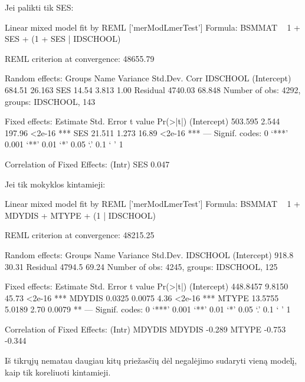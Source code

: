 \documentclass[a4paper]{article}
\begin{document}
Jei palikti tik SES:
\begin{Schunk}
\begin{Soutput}
Linear mixed model fit by REML ['merModLmerTest']
Formula: BSMMAT ~ 1 + SES + (1 + SES | IDSCHOOL) 

REML criterion at convergence: 48655.79 

Random effects:
 Groups   Name        Variance Std.Dev. Corr
 IDSCHOOL (Intercept)  684.51  26.163       
          SES           14.54   3.813   1.00
 Residual             4740.03  68.848       
Number of obs: 4292, groups: IDSCHOOL, 143

Fixed effects:
            Estimate Std. Error t value Pr(>|t|)    
(Intercept)  503.595      2.544  197.96   <2e-16 ***
SES           21.511      1.273   16.89   <2e-16 ***
---
Signif. codes:  0 ‘***’ 0.001 ‘**’ 0.01 ‘*’ 0.05 ‘.’ 0.1 ‘ ’ 1

Correlation of Fixed Effects:
    (Intr)
SES 0.047 
\end{Soutput}
\end{Schunk}
Jei tik mokyklos kintamieji:
\begin{Schunk}
\begin{Soutput}
Linear mixed model fit by REML ['merModLmerTest']
Formula: BSMMAT ~ 1 + MDYDIS + MTYPE + (1 | IDSCHOOL) 

REML criterion at convergence: 48215.25 

Random effects:
 Groups   Name        Variance Std.Dev.
 IDSCHOOL (Intercept)  918.8   30.31   
 Residual             4794.5   69.24   
Number of obs: 4245, groups: IDSCHOOL, 125

Fixed effects:
            Estimate Std. Error t value Pr(>|t|)    
(Intercept) 448.8457     9.8150   45.73   <2e-16 ***
MDYDIS        0.0325     0.0075    4.36   <2e-16 ***
MTYPE        13.5755     5.0189    2.70   0.0079 ** 
---
Signif. codes:  0 ‘***’ 0.001 ‘**’ 0.01 ‘*’ 0.05 ‘.’ 0.1 ‘ ’ 1

Correlation of Fixed Effects:
       (Intr) MDYDIS
MDYDIS -0.289       
MTYPE  -0.753 -0.344
\end{Soutput}
\end{Schunk}
Iš tikrųjų nematau daugiau kitų priežasčių dėl negalėjimo sudaryti vieną modelį, kaip tik koreliuoti kintamieji.
\end{document}
